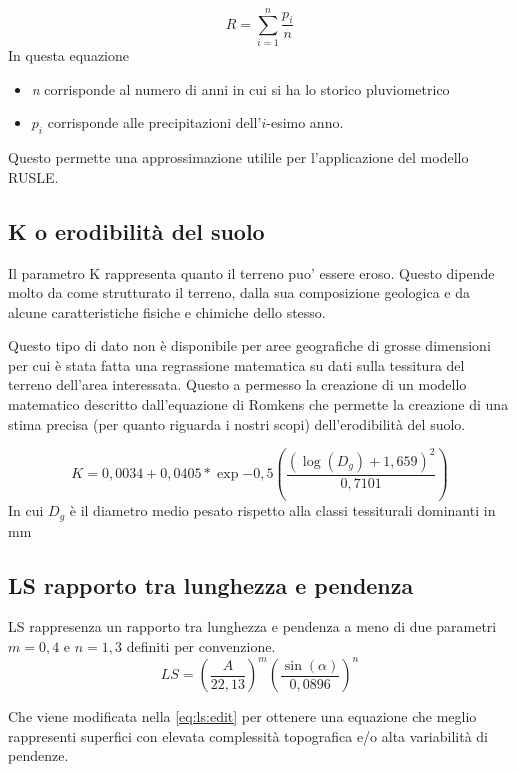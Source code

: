 \begin{equation}\label{eq:r}
	R = \sum_{i=1}^{n} \frac{p_i}{n}
\end{equation}
In questa equazione 
\begin{itemize}
	\item \textit{n} corrisponde al numero di anni in cui si ha lo storico pluviometrico
	\item \textit{$p_i$} corrisponde alle precipitazioni dell'$i$-esimo anno.
\end{itemize}

Questo permette una approssimazione utilile per l'applicazione del modello RUSLE.

\subsection{K o erodibilità del suolo}
Il parametro K rappresenta quanto il terreno puo' essere eroso. Questo dipende molto da come  strutturato il terreno, dalla sua composizione geologica e da alcune caratteristiche fisiche e chimiche dello stesso.

Questo tipo di dato non è disponibile per aree geografiche di grosse dimensioni per cui è stata fatta una regrassione matematica su dati sulla tessitura del terreno dell'area interessata. Questo a permesso la creazione di un modello matematico descritto dall'equazione di Romkens che permette la creazione di una stima precisa (per quanto riguarda i nostri scopi) dell'erodibilità del suolo.

\begin{equation}\label{eq:k}
	K=0,0034 + 0,0405 * \exp{-0,5\left( \dfrac{(\log(D_g)+1,659)^2}{0,7101} \right) }
\end{equation}
In cui $D_g$ è il diametro medio pesato rispetto alla classi tessiturali dominanti in mm


\subsection{LS rapporto tra lunghezza e pendenza}
LS rappresenza un rapporto tra lunghezza e pendenza a meno di due parametri $m=0,4$ e $n=1,3$ definiti per convenzione. 
\begin{equation}\label{eq:ls}
	LS = \left(  \dfrac{A}{22,13} \right)^m
	\left(  \dfrac{\sin(\alpha)}{0,0896} \right)^n
\end{equation}

Che viene modificata nella \ref{eq:ls:edit} per ottenere una equazione che meglio rappresenti superfici con elevata complessità topografica e/o alta variabilità di pendenze.

